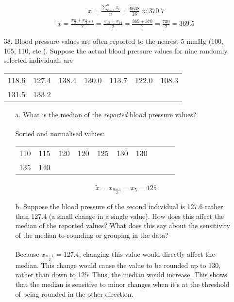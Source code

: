 \documentclass[letterpaper,12pt]{article}
\begin{document}
\begin{enumerate}
\begin{enumerate}
\begin{align*}
          \bar{x} = \frac{\sum_{i=1}^{n} x_{i}}{n} = \frac{9638}{26} \approx 370.7
        \end{align*}
        \begin{align*}
          \tilde{x} = \frac{x_{\frac{n}{2}} + x_{\frac{n}{2} + 1}}{2} = \frac{x_{13} + x_{14}}{2} = \frac{369 + 370}{2} = \frac{739}{2} = 369.5
        \end{align*}
    \end{enumerate}
  \item[38.]
    Blood pressure values are often reported to the nearest 5 mmHg (100, 105, 110, etc.). Suppose the actual blood pressure values for nine randomly selected individuals are
    \begin{center}
      \begin{tabular}{ccccccc}
        118.6 & 127.4 & 138.4 & 130.0 & 113.7 & 122.0 & 108.3 \\
        131.5 & 133.2
      \end{tabular}
    \end{center}
    \begin{enumerate}
      \item[a.]
        What is the median of the \textit{reported} blood pressure values?
        \\ \\
        Sorted and normalised values:
        \begin{center}
          \begin{tabular}{cccccccccc}
            110 & 115 & 120 & 120 & 125 & 130 & 130 \\
            135 & 140
          \end{tabular}
        \end{center}
        \begin{align*}
          \tilde{x} = x_{\frac{n + 1}{2}} = x_{5} = 125
        \end{align*}
      \item[b.]
        Suppose the blood pressure of the second individual is 127.6 rather than 127.4 (a small change in a single value). How does this affect the median of the reported values? What does this say about the sensitivity of the median to rounding or grouping in the data?
        \\ \\
        Because $x_{\frac{n + 1}{2}} = 127.4$, changing this value would directly affect the median. This change would cause the value to be rounded up to 130, rather than down to 125. Thus, the median would increase. This shows that the median is sensitive to minor changes when it's at the threshold of being rounded in the other direction.

\end{enumerate}
\end{enumerate}
\end{document}
